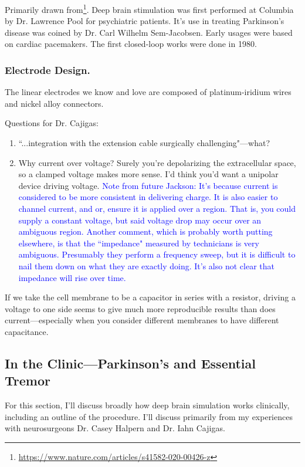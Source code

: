 Primarily drawn from\footnote{\url{https://www.nature.com/articles/s41582-020-00426-z}}. Deep brain stimulation was first performed at Columbia by Dr. Lawrence Pool for psychiatric patients. It's use in treating Parkinson's disease was coined by Dr. Carl Wilhelm Sem-Jacobsen. Early usages were based on cardiac pacemakers. The first closed-loop works were done in 1980.

\subsubsection{Electrode Design.}

The linear electrodes we know and love are composed of platinum-iridium wires and  nickel alloy connectors. 

\color{red}
Questions for Dr. Cajigas:
\begin{enumerate}
    \itemsep 0em
    \item ``...integration with the extension cable surgically challenging"---what?
    \item Why current over voltage? Surely you're depolarizing the extracellular space, so a clamped voltage makes more sense. I'd think you'd want a unipolar device driving voltage.
    \textcolor{blue}{Note from future Jackson: It's because current is considered to be more consistent in delivering charge. It is also easier to channel current, and or, ensure it is applied over a region. That is, you could supply a constant voltage, but said voltage drop may occur over an ambiguous region. Another comment, which is probably worth putting elsewhere, is that the ``impedance" measured by technicians is very ambiguous. Presumably they perform a frequency sweep, but it is difficult to nail them down on what they are exactly doing. It's also not clear that impedance will rise over time. }
\end{enumerate}
If we take the cell membrane to be a capacitor in series with a resistor, driving a voltage to one side seems to give much more reproducible results than does current---especially when you consider different membranes to have different capacitance. 


\color{black}

\subsection{In the Clinic---Parkinson's and Essential Tremor}

For this section, I'll discuss broadly how deep brain simulation works clinically, including an outline of the procedure. I'll discuss primarily from my experiences with neurosurgeons Dr. Casey Halpern and Dr. Iahn Cajigas.\newline



